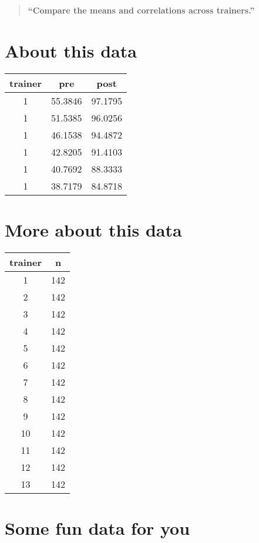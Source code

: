 \documentclass[
]{book}
\begin{document}
\begin{quote}
\textbf{``Compare the means and correlations across trainers.''}
\end{quote}

\hypertarget{about-this-data}{%
\section{About this data}\label{about-this-data}}

\begin{tabular}{c|c|c}
\hline
trainer & pre & post\\
\hline
1 & 55.3846 & 97.1795\\
\hline
1 & 51.5385 & 96.0256\\
\hline
1 & 46.1538 & 94.4872\\
\hline
1 & 42.8205 & 91.4103\\
\hline
1 & 40.7692 & 88.3333\\
\hline
1 & 38.7179 & 84.8718\\
\hline
\end{tabular}

\hypertarget{more-about-this-data}{%
\section{More about this data}\label{more-about-this-data}}

\begin{tabular}{c|c}
\hline
trainer & n\\
\hline
1 & 142\\
\hline
2 & 142\\
\hline
3 & 142\\
\hline
4 & 142\\
\hline
5 & 142\\
\hline
6 & 142\\
\hline
7 & 142\\
\hline
8 & 142\\
\hline
9 & 142\\
\hline
10 & 142\\
\hline
11 & 142\\
\hline
12 & 142\\
\hline
13 & 142\\
\hline
\end{tabular}

\hypertarget{some-fun-data-for-you}{%
\section{Some fun data for you}\label{some-fun-data-for-you}}
\end{document}
